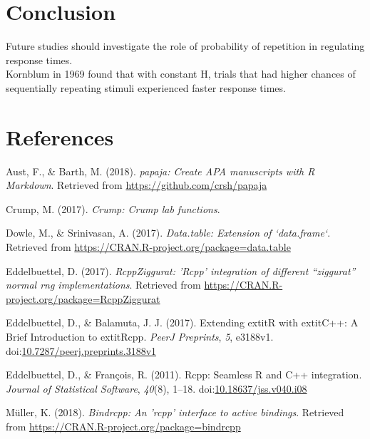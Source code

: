 \documentclass[floatsintext,man]{apa6}
\theoremstyle{definition}
\theoremstyle{definition}
\theoremstyle{definition}
\theoremstyle{remark}
\begin{document}
\section{Conclusion}\label{conclusion}

Future studies should investigate the role of probability of repetition
in regulating response times.\\
Kornblum in 1969 found that with constant H, trials that had higher
chances of sequentially repeating stimuli experienced faster response
times.

\newpage

\section{References}\label{references}

\begingroup
\setlength{\parindent}{-0.5in} \setlength{\leftskip}{0.5in}

\hypertarget{refs}{}
\hypertarget{ref-R-papaja}{}
Aust, F., \& Barth, M. (2018). \emph{papaja: Create APA manuscripts with
R Markdown}. Retrieved from \url{https://github.com/crsh/papaja}

\hypertarget{ref-R-Crump}{}
Crump, M. (2017). \emph{Crump: Crump lab functions}.

\hypertarget{ref-R-data.table}{}
Dowle, M., \& Srinivasan, A. (2017). \emph{Data.table: Extension of
`data.frame`}. Retrieved from
\url{https://CRAN.R-project.org/package=data.table}

\hypertarget{ref-R-RcppZiggurat}{}
Eddelbuettel, D. (2017). \emph{RcppZiggurat: 'Rcpp' integration of
different ``ziggurat'' normal rng implementations}. Retrieved from
\url{https://CRAN.R-project.org/package=RcppZiggurat}

\hypertarget{ref-R-Rcpp_b}{}
Eddelbuettel, D., \& Balamuta, J. J. (2017). Extending extitR with
extitC++: A Brief Introduction to extitRcpp. \emph{PeerJ Preprints},
\emph{5}, e3188v1.
doi:\href{https://doi.org/10.7287/peerj.preprints.3188v1}{10.7287/peerj.preprints.3188v1}

\hypertarget{ref-R-Rcpp_a}{}
Eddelbuettel, D., \& François, R. (2011). Rcpp: Seamless R and C++
integration. \emph{Journal of Statistical Software}, \emph{40}(8),
1--18.
doi:\href{https://doi.org/10.18637/jss.v040.i08}{10.18637/jss.v040.i08}

\hypertarget{ref-R-bindrcpp}{}
Müller, K. (2018). \emph{Bindrcpp: An 'rcpp' interface to active
bindings}. Retrieved from
\url{https://CRAN.R-project.org/package=bindrcpp}
\end{document}
